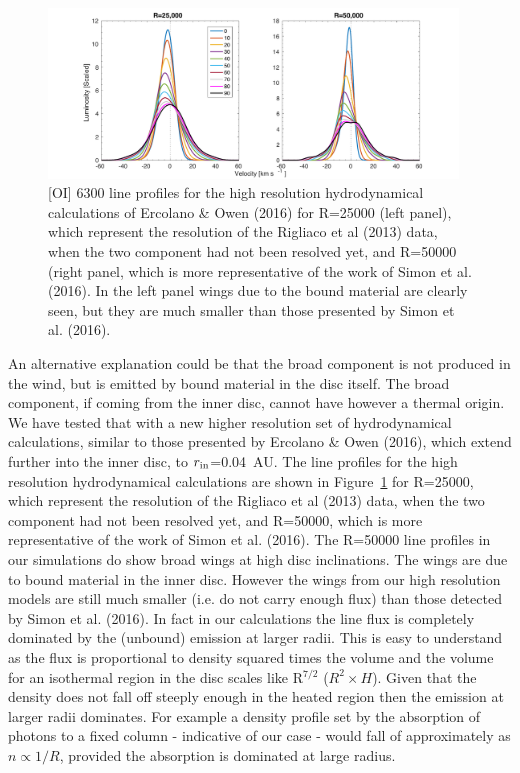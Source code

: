 \documentclass[10pt,fleqn,twoside]{article}
\begin{document}
 \begin{figure}
   \centering
   \includegraphics[width=0.97\textwidth]{lines_both.pdf}
  
   \caption{[OI] 6300 line
profiles for the high resolution hydrodynamical calculations of
Ercolano \& Owen (2016) for R=25000 (left panel), which represent the resolution of the
Rigliaco et al (2013) data, when the two component had not been
resolved yet, and R=50000 (right panel, which is more representative
of the work of Simon et al. (2016). In the left panel wings due to the
bound material are clearly seen, but they are much smaller than those
presented by Simon et al. (2016).
}
              \label{fig:wings}
    \end{figure}


An alternative explanation could be that the broad
component is not produced in the wind, but is emitted by bound
material in the disc itself. The broad component, if coming from the
inner disc, cannot have however a thermal origin. We have tested that
with a new higher resolution set of hydrodynamical calculations,
similar to those presented by Ercolano \& Owen (2016), which
extend further into the inner disc, to $r_{\rm in}$=0.04~AU. The line
profiles for the high resolution hydrodynamical calculations are shown
in Figure~\ref{fig:wings} for R=25000, which represent the resolution of the
Rigliaco et al (2013) data, when the two component had not been
resolved yet, and R=50000, which is more representative
of the work of Simon et al. (2016). The
R=50000 line profiles in our simulations do show broad wings at high disc
inclinations. The wings are due to bound material in the inner
disc. However the wings from our high resolution models are still much
smaller (i.e. do not carry enough flux) than those detected by
Simon et al. (2016). In fact in our calculations the line flux
is completely dominated by the (unbound) emission at larger
radii. This is easy to understand as the flux is proportional to
density squared times the volume and the volume for an isothermal
region in the disc scales like R$^{7/2}$ ($R^2\times H$). Given that
the density does not fall off steeply enough in the heated region then
the emission at larger radii dominates. For 
example a density profile set by the absorption of photons to a fixed
column - indicative of our case - would fall of approximately as
$n\propto1/R$, provided the absorption is dominated at large radius.
\end{document}
